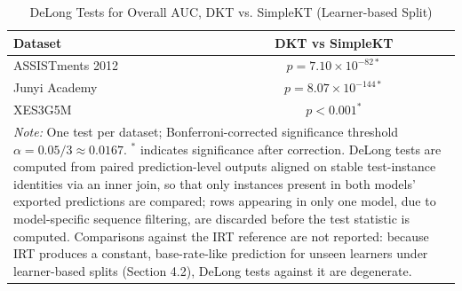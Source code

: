 \begin{table}[htbp]
\caption{DeLong Tests for Overall AUC, DKT vs. SimpleKT (Learner-based Split)}
\label{tab:delong_overall}
\centering
\scriptsize
\setlength{\tabcolsep}{3pt}
\begin{tabular}{lc}
\toprule
\textbf{Dataset} & \textbf{DKT vs SimpleKT} \\
\midrule
ASSISTments 2012 & $p = 7.10 \times 10^{-82*}$ \\
Junyi Academy    & $p = 8.07 \times 10^{-144*}$ \\
XES3G5M          & $p < 0.001^{*}$ \\
\bottomrule
\multicolumn{2}{p{11.5cm}}{\textit{Note:} One test per dataset; Bonferroni-corrected significance threshold $\alpha = 0.05/3 \approx 0.0167$. $^{*}$ indicates significance after correction. DeLong tests are computed from paired prediction-level outputs aligned on stable test-instance identities via an inner join, so that only instances present in both models' exported predictions are compared; rows appearing in only one model, due to model-specific sequence filtering, are discarded before the test statistic is computed. Comparisons against the IRT reference are not reported: because IRT produces a constant, base-rate-like prediction for unseen learners under learner-based splits (Section 4.2), DeLong tests against it are degenerate.} \\
\end{tabular}
\end{table}
